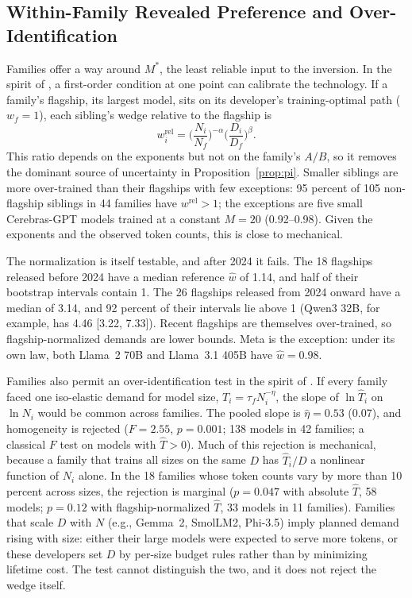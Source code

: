 \subsection{Within-Family Revealed Preference and Over-Identification}\label{sec:wedge-family}

Families offer a way around $M^*$, the least reliable input to the inversion. In the spirit of
\citet{gandhi2020identification}, a first-order condition at one point can calibrate the technology. If a family's
flagship, its largest model, sits on its developer's training-optimal path ($w_f=1$), each sibling's wedge relative to
the flagship is
\begin{equation}\label{eq:sV-rel}
w_i^{\mathrm{rel}}=\Big(\frac{N_i}{N_f}\Big)^{-\alpha}\Big(\frac{D_i}{D_f}\Big)^{\beta}.
\end{equation}
This ratio depends on the exponents but not on the family's $A/B$, so it removes the dominant source of uncertainty in
Proposition~\ref{prop:pi}. Smaller siblings are more over-trained than their flagships with few exceptions: 95 percent of
105 non-flagship siblings in 44 families have $w^{\mathrm{rel}}>1$; the exceptions are five small Cerebras-GPT models
trained at a constant $M=20$ (0.92--0.98). Given the exponents and the observed token counts, this is close to mechanical.

The normalization is itself testable, and after 2024 it fails. The 18 flagships released before 2024 have a median
reference $\hat w$ of 1.14, and half of their bootstrap intervals contain 1. The 26 flagships released from 2024 onward
have a median of 3.14, and 92 percent of their intervals lie above 1 (Qwen3 32B, for example, has 4.46 [3.22, 7.33]).
Recent flagships are themselves over-trained, so flagship-normalized demands are lower bounds. Meta is the exception:
under its own law, both Llama~2 70B and Llama~3.1 405B have $\hat w=0.98$.

Families also permit an over-identification test in the spirit of \citet{raval2023testing}. If every family faced one
iso-elastic demand for model size, $T_i=\tau_fN_i^{-\eta}$, the slope of $\ln\hat T_i$ on $\ln N_i$ would be common
across families. The pooled slope is $\hat\eta=0.53$ (0.07), and homogeneity is rejected ($F=2.55$, $p=0.001$; 138
models in 42 families; a classical $F$ test on models with $\hat T>0$). Much of this rejection is mechanical, because a
family that trains all sizes on the same $D$ has $\hat T_i/D$ a nonlinear function of $N_i$ alone. In the 18 families
whose token counts vary by more than 10 percent across sizes, the rejection is marginal ($p=0.047$ with absolute $\hat
T$, 58 models; $p=0.12$ with flagship-normalized $\hat T$, 33 models in 11 families). Families that scale $D$ with $N$
(e.g., Gemma~2, SmolLM2, Phi-3.5) imply planned demand rising with size: either their large models were expected to
serve more tokens, or these developers set $D$ by per-size budget rules rather than by minimizing lifetime cost. The
test cannot distinguish the two, and it does not reject the wedge itself.

